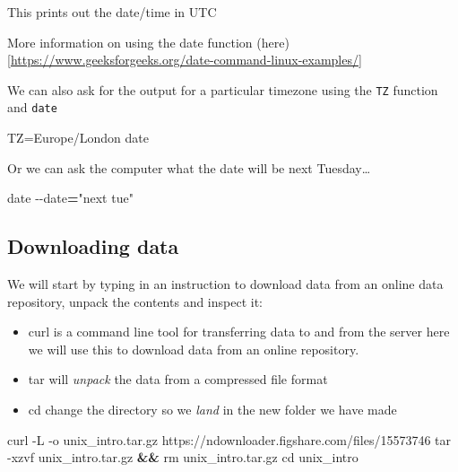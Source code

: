 \documentclass[
]{book}
\newenvironment{Shaded}{\begin{snugshade}}{\end{snugshade}}
\newcommand{\AttributeTok}[1]{\textcolor[rgb]{0.77,0.63,0.00}{#1}}
\newcommand{\BuiltInTok}[1]{#1}
\newcommand{\ExtensionTok}[1]{#1}
\newcommand{\FunctionTok}[1]{\textcolor[rgb]{0.00,0.00,0.00}{#1}}
\newcommand{\KeywordTok}[1]{\textcolor[rgb]{0.13,0.29,0.53}{\textbf{#1}}}
\newcommand{\NormalTok}[1]{#1}
\newcommand{\OperatorTok}[1]{\textcolor[rgb]{0.81,0.36,0.00}{\textbf{#1}}}
\newcommand{\StringTok}[1]{\textcolor[rgb]{0.31,0.60,0.02}{#1}}
\newcommand{\VariableTok}[1]{\textcolor[rgb]{0.00,0.00,0.00}{#1}}
\begin{document}
This prints out the date/time in UTC

More information on using the date function (here){[}\url{https://www.geeksforgeeks.org/date-command-linux-examples/}{]}

We can also ask for the output for a particular timezone using the \texttt{TZ} function and \texttt{date}

\begin{Shaded}
\begin{Highlighting}[]
    \VariableTok{TZ=}\NormalTok{Europe/London }\FunctionTok{date}
\end{Highlighting}
\end{Shaded}

Or we can ask the computer what the date will be next Tuesday\ldots{}

\begin{Shaded}
\begin{Highlighting}[]
    \FunctionTok{date} \AttributeTok{{-}{-}date}\OperatorTok{=}\StringTok{"next tue"}
\end{Highlighting}
\end{Shaded}

\hypertarget{downloading-data}{%
\subsection{Downloading data}\label{downloading-data}}

We will start by typing in an instruction to download data from an online data repository, unpack the contents and inspect it:

\begin{itemize}
\item
  curl is a command line tool for transferring data to and from the server here we will use this to download data from an online repository.
\item
  tar will \emph{unpack} the data from a compressed file format
\item
  cd change the directory so we \emph{land} in the new folder we have made
\end{itemize}

\begin{Shaded}
\begin{Highlighting}[]
    \ExtensionTok{curl} \AttributeTok{{-}L} \AttributeTok{{-}o}\NormalTok{ unix\_intro.tar.gz https://ndownloader.figshare.com/files/15573746}
    \FunctionTok{tar} \AttributeTok{{-}xzvf}\NormalTok{ unix\_intro.tar.gz }\KeywordTok{\&\&} \FunctionTok{rm}\NormalTok{ unix\_intro.tar.gz}
    \BuiltInTok{cd}\NormalTok{ unix\_intro}
\end{Highlighting}
\end{Shaded}
\end{document}
